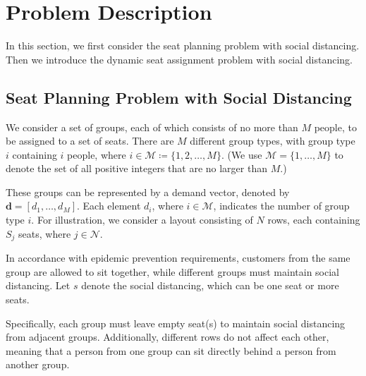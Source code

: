 \section{Problem Description}
In this section, we first consider the seat planning problem with social distancing. Then we introduce the dynamic seat assignment problem with social distancing.





\subsection{Seat Planning Problem with Social Distancing}\label{dynamic_demand}
We consider a set of groups, each of which consists of no more than $M$ people, to be assigned to a set of seats. There are $M$ different group types, with group type $i$ containing $i$ people, where $i \in \mathcal{M} \coloneqq \{1,2, \ldots, M\}$. (We use $\mathcal{M} = \{1, \ldots, M\}$ to denote the set of all positive integers that are no larger than $M$.)

These groups can be represented by a demand vector, denoted by $\mathbf{d} = [d_1, \ldots, d_M]$. Each element $d_i$, where $i \in \mathcal{M}$, indicates the number of group type $i$. For illustration, we consider a layout consisting of $N$ rows, each containing $S_j$ seats, where $j \in \mathcal{N}$.

In accordance with epidemic prevention requirements, customers from the same group are allowed to sit together, while different groups must maintain social distancing. Let $s$ denote the social distancing, which can be one seat or more seats.

Specifically, each group must leave empty seat(s) to maintain social distancing from adjacent groups. Additionally, different rows do not affect each other, meaning that a person from one group can sit directly behind a person from another group.


